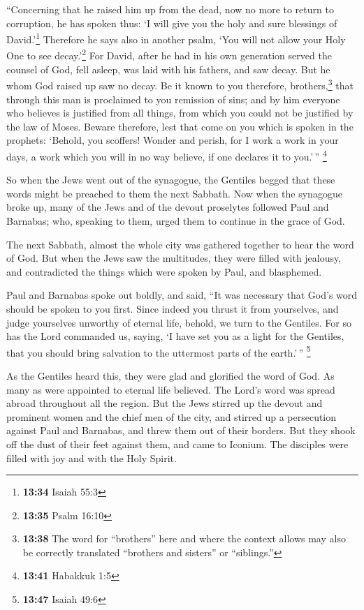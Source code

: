  ``Concerning that he raised him up from the dead, now no
more to return to corruption, he has spoken thus: `I will give you the
holy and sure blessings of David.'\footnote{\textbf{13:34} Isaiah 55:3}
 Therefore he says also in another psalm, `You will not
allow your Holy One to see decay.'\footnote{\textbf{13:35} Psalm 16:10}
 For David, after he had in his own generation served the
counsel of God, fell asleep, was laid with his fathers, and saw decay.
 But he whom God raised up saw no decay. 
Be it known to you therefore, brothers,\footnote{\textbf{13:38} The word
  for ``brothers'' here and where the context allows may also be
  correctly translated ``brothers and sisters'' or ``siblings.''} that
through this man is proclaimed to you remission of sins; 
and by him everyone who believes is justified from all things, from
which you could not be justified by the law of Moses. 
Beware therefore, lest that come on you which is spoken in the prophets:
 `Behold, you scoffers! Wonder and perish, for I work a
work in your days, a work which you will in no way believe, if one
declares it to you.'\,'' \footnote{\textbf{13:41} Habakkuk 1:5}

 So when the Jews went out of the synagogue, the Gentiles
begged that these words might be preached to them the next Sabbath.
 Now when the synagogue broke up, many of the Jews and of
the devout proselytes followed Paul and Barnabas; who, speaking to them,
urged them to continue in the grace of God.

 The next Sabbath, almost the whole city was gathered
together to hear the word of God.  But when the Jews saw
the multitudes, they were filled with jealousy, and contradicted the
things which were spoken by Paul, and blasphemed.

 Paul and Barnabas spoke out boldly, and said, ``It was
necessary that God's word should be spoken to you first. Since indeed
you thrust it from yourselves, and judge yourselves unworthy of eternal
life, behold, we turn to the Gentiles.  For so has the
Lord commanded us, saying, `I have set you as a light for the Gentiles,
that you should bring salvation to the uttermost parts of the
earth.'\,'' \footnote{\textbf{13:47} Isaiah 49:6}

 As the Gentiles heard this, they were glad and glorified
the word of God. As many as were appointed to eternal life believed.
 The Lord's word was spread abroad throughout all the
region.  But the Jews stirred up the devout and prominent
women and the chief men of the city, and stirred up a persecution
against Paul and Barnabas, and threw them out of their borders.
 But they shook off the dust of their feet against them,
and came to Iconium.  The disciples were filled with joy
and with the Holy Spirit.


